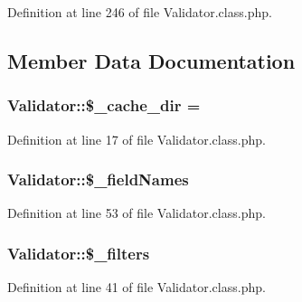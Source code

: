 Definition at line 246 of file Validator.\+class.\+php.



\subsection{Member Data Documentation}
\subsubsection[{\texorpdfstring{\$\+\_\+cache\+\_\+dir}{$_cache_dir}}]{\setlength{\rightskip}{0pt plus 5cm}Validator\+::\$\+\_\+cache\+\_\+dir = \textquotesingle{}\textquotesingle{}}\hypertarget{classValidator_aaba7f33304aedded2c308120a0925e77}{}\label{classValidator_aaba7f33304aedded2c308120a0925e77}


Definition at line 17 of file Validator.\+class.\+php.

\subsubsection[{\texorpdfstring{\$\+\_\+field\+Names}{$_fieldNames}}]{\setlength{\rightskip}{0pt plus 5cm}Validator\+::\$\+\_\+field\+Names}\hypertarget{classValidator_a5689ec4c9687c826fc82902fa9b662d8}{}\label{classValidator_a5689ec4c9687c826fc82902fa9b662d8}


Definition at line 53 of file Validator.\+class.\+php.

\subsubsection[{\texorpdfstring{\$\+\_\+filters}{$_filters}}]{\setlength{\rightskip}{0pt plus 5cm}Validator\+::\$\+\_\+filters}\hypertarget{classValidator_ab86eb87cb828002c10d06be613d7b013}{}\label{classValidator_ab86eb87cb828002c10d06be613d7b013}


Definition at line 41 of file Validator.\+class.\+php.


